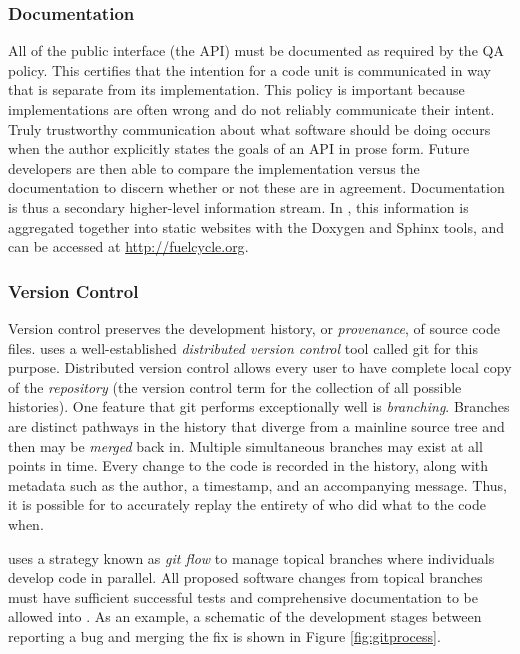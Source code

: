 \subsubsection{Documentation}

All of the public interface (the \gls{API}) must be documented as required by the \Cyclus
\gls{QA} policy. This certifies that the intention for a code unit is communicated
in way that is separate from its implementation. This policy is important
because implementations are often wrong and do not reliably communicate their intent. Truly trustworthy communication about what
software should be doing occurs when the author explicitly states the
goals of an \gls{API} in prose form. Future developers are then able to
compare the implementation versus the documentation to discern whether or not
these are in agreement. Documentation is thus a secondary higher-level information
stream.  In \Cyclus, this information is aggregated together into static
websites with the Doxygen \cite{van_heesch_doxygen:_2008} and Sphinx
\cite{brandl_sphinx_2014}
tools, and can be accessed at \url{http://fuelcycle.org}.

\subsubsection{Version Control}

Version control preserves the development history, or \emph{provenance}, of
source code files. \Cyclus uses a well-established \emph{distributed version
control} tool called git \cite{software_freedom_conservancy_git_2014} for this
purpose.  Distributed version control allows every
user to have complete local copy of the \emph{repository} (the version control
term for the collection of all possible histories).
One feature that git performs exceptionally well is \emph{branching}.
Branches are distinct pathways in the history that diverge from a mainline source
tree and then may be \emph{merged} back in. Multiple simultaneous
branches may exist at all points in time. Every change to the code is recorded
in the history, along with metadata such as the author, a timestamp, and an
accompanying message. Thus,
it is possible for \Cyclus to accurately replay the entirety of who did what to the
code when.

\Cyclus uses a strategy known as \emph{git flow}
\cite{kalliamvakou_code-centric_2014} to manage topical branches where
individuals develop code in parallel. All proposed software changes from
topical branches must have sufficient successful tests and comprehensive
documentation to be allowed into \Cyclus.  As an example, a schematic of the
development stages between reporting a bug and merging the fix is shown in
Figure \ref{fig:gitprocess}.

